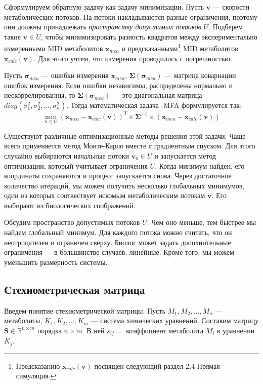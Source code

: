 \documentclass[14pt, a4paper]{extreport}
\begin{document}
Сформулируем обратную задачу как задачу минимизации. Пусть $\boldsymbol{v}$ --- скорости метаболических потоков. На потоки накладываются разные ограничения, поэтому они должны принадлежать \emph{пространству допустимых потоков} $U$. Подберем такие $\boldsymbol{v} \in U$, чтобы минимизировать разность квадратов между экспериментально измеренными MID метаболитов $\boldsymbol{x}_{mea}$ и предсказанными\footnote{Предсказанию $\boldsymbol{x}_{calc}(\boldsymbol{v})$ посвящен следующий раздел 2.4 Прямая симуляция.} MID метаболитов $\boldsymbol{x}_{calc}(\boldsymbol{v})$. Для этого учтем, что измерения проводились с погрешностью. 

Пусть $\boldsymbol{\sigma}_{mea}$ --- ошибки измерения $\boldsymbol{x}_{mea}$, $\boldsymbol{\Sigma}(\boldsymbol{\sigma}_{mea})$ --- матрица ковариации ошибок измерения. Если ошибки независимы, распределены нормально и нескоррелированны, то $\boldsymbol{\Sigma}(\boldsymbol{\sigma}_{mea})$ --- это диагональная матрица \\$diag(\sigma_{1}^2, \sigma_{2}^{2}, \dots, \sigma_{n}^2)$. Тогда математическая задача -MFA формулируется так:
$$\min_{\boldsymbol{v} \in U}{ } (\boldsymbol{x}_{mea} - \boldsymbol{x}_{calc}(\boldsymbol{v}))^T \times \boldsymbol{\Sigma}^{-1} \times (\boldsymbol{x}_{mea} - \boldsymbol{x}_{calc}(\boldsymbol{v}))$$

Существуют различные оптимизационные методы решения этой задачи. Чаще всего применяется метод Монте-Карло вместе с градиентным спуском. Для этого случайно выбираются начальные потоки $\boldsymbol{v}_0 \in U$ и запускается метод оптимизации, который учитывает ограничения $U$. Когда минимум найден, его координаты сохраняются и процесс запускается снова. Через достаточное количество итераций, мы можем получить несколько глобальных минимумов, один из которых соотвествует искомым метаболическим потокам $\boldsymbol{v}$. Его выбирают из биологических соображений.

Обсудим пространство допустимых потоков $U$. Чем оно меньше, тем быстрее мы найдем глобальный минимум. Для каждого потока можно считать, что он неотрицателен и ограничен сверху. Биолог может задать дополнительные ограничения --- в большинстве случаев, линейные. Кроме того, мы можем уменьшить размерность системы.

\subsection{Стехиометрическая матрица}

Введем понятие стехиометрической матрицы. Пусть $M_1, M_2, \dots, M_n$ --- метаболиты, $K_1, K_2, \dots, K_m$ --- система химических уравнений. 
Составим матрицу $\boldsymbol{S} \in \mathbb{R}^{n \times m}$ порядка $n \times m$. В ней $s_{ij} = $ коэффициент метаболита $M_i$ в уравнении $K_j$.
\end{document}
